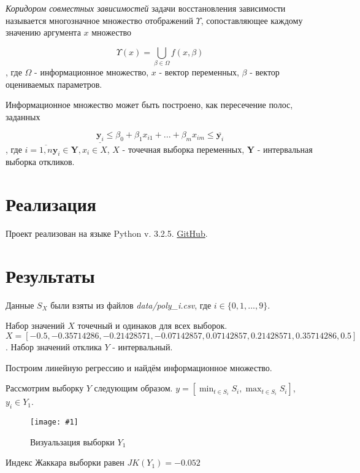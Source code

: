 \documentclass[a4paper,12pt]{article}
\newcommand{\plot}[3]{
    \begin{figure}[H]
        \begin{center}
            \texttt{[image: \#1]}
            \caption{#2}
            \label{#3}
        \end{center}
    \end{figure}
}
\begin{document}
    \textsl{Коридором совместных зависимостей} задачи восстановления зависимости
    называется многозначное множество отображений $ \Upsilon $, сопоставляющее
    каждому значению аргумента $ x $ множество
    
    \begin{equation}
        \Upsilon(x) = \bigcup_{\beta \in \Omega} f(x, \beta)
    \end{equation}
    , где $ \Omega $ - информационное множество, $ x $ - вектор переменных, $ \beta $ - вектор оцениваемых параметров. 

    Информационное множество может быть построено, как пересечение полос, заданных
    
    \begin{equation}
        \underline{\textbf{y}_i} \leq \beta_0 + \beta_1 x_{i1} + ... + \beta_m x_{im} \leq \overline{\textbf{y}_i}
    \end{equation}
    , где $ i = \overline{1, n} \textbf{y}_i \in \textbf{Y}, x_i \in X $, $ X $ - точечная выборка переменных,
    $ \textbf{Y} $ - интервальная выборка откликов.

    \section{Реализация}
    \quad Проект реализован на языке Python v. 3.2.5.
    \href{https://github.com/HellInsider/Intervals_2}{GitHub}.

    \section{Результаты}
    \quad Данные $ S_X $ были взяты из файлов \textsl{data/poly\_i.csv}, \newline
    где $ i \in \{0, 1, ... , 9\} $. \newline
    
    Набор значений $ X $ точечный и одинаков для всех выборок. \newline
    $ X = [-0.5, -0.35714286, -0.21428571, -0.07142857, 0.07142857, 0.21428571, 0.35714286, 0.5]  $.
    Набор значений отклика $ Y $ - интервальный.
    
    Построим линейную регрессию и найдём информационное множество.

    Рассмотрим выборку $ Y $ следующим образом. $ y = [\min_{t \in S_i}{S_i}, \max_{t \in S_i}{S_i}]$, \newline
    $ y_i \in Y_1 $.
    \plot{sampleY1}{Визуальзация выборки $ Y_1 $}{p:sampleY1}
        Индекс Жаккара выборки равен $ JK(Y_1) =  -0.052 $
    
\end{document}

